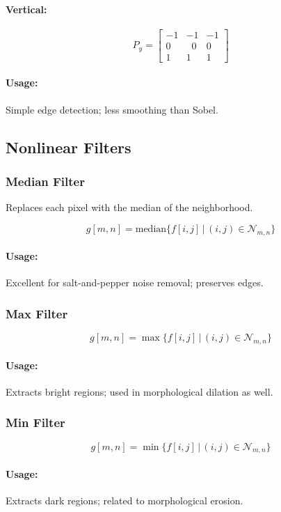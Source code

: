 \documentclass{AnantDocumentation}
\begin{document}
\paragraph{Vertical:}
\[
P_y =
\begin{bmatrix}
-1 & -1 & -1\\
0 & \;\;0 & 0\\
1 & 1 & 1
\end{bmatrix}
\]

\paragraph{Usage:}
Simple edge detection; less smoothing than Sobel.

\subsection{Nonlinear Filters}

\subsubsection{Median Filter}
Replaces each pixel with the median of the neighborhood.

\[
g[m,n] = \text{median} \{ f[i,j] \, | \, (i,j) \in \mathcal{N}_{m,n} \}
\]

\paragraph{Usage:}
Excellent for salt-and-pepper noise removal; preserves edges.

\subsubsection{Max Filter}
\[
g[m,n] = \max \{ f[i,j] \, | \, (i,j) \in \mathcal{N}_{m,n} \}
\]

\paragraph{Usage:}
Extracts bright regions; used in morphological dilation as well.

\subsubsection{Min Filter}
\[
g[m,n] = \min \{ f[i,j] \, | \, (i,j) \in \mathcal{N}_{m,n} \}
\]

\paragraph{Usage:}
Extracts dark regions; related to morphological erosion.
\end{document}
